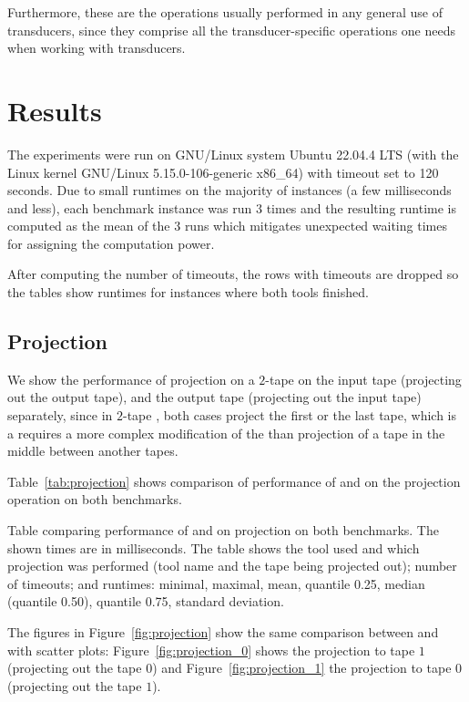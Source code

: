 Furthermore, these are the operations usually performed in any general use of transducers, since they comprise all the transducer-specific operations one needs when working with transducers.

\section{Results}

The experiments were run on GNU/Linux system Ubuntu 22.04.4 LTS (with the Linux kernel GNU/Linux 5.15.0-106-generic x86\_64) with timeout set to 120 seconds. Due to small runtimes on the majority of instances (a few milliseconds and less), each benchmark instance was run $3$ times and the resulting runtime is computed as the mean of the $3$ runs which mitigates unexpected waiting times for assigning the computation power.

After computing the number of timeouts, the rows with timeouts are dropped so the tables show runtimes for instances where both tools finished.

\subsection{Projection}

We show the performance of projection on a $2$-tape \nfts on the input tape (projecting out the output tape), and the output tape (projecting out the input tape) separately, since in $2$-tape \nfts, both cases project the first or the last tape, which is a requires a more complex modification of the \nft than projection of a tape in the middle between another tapes.

Table~\ref{tab:projection} shows comparison of performance of \mata and \mona on the projection operation on both benchmarks.

\begin{table}[ht]
  \centering
  
  \caption{
    Table comparing performance of \mata and \mona on projection on both benchmarks.
    The shown times are in milliseconds.
    The table shows the tool used and which projection was performed (tool name and the tape being projected out); number of timeouts; and runtimes: minimal, maximal, mean, quantile 0.25, median (quantile 0.50), quantile 0.75, standard deviation.
  }
  \label{tab:projection}
\end{table}

The figures in Figure~\ref{fig:projection} show the same comparison between \mata and \mona with scatter plots: Figure~\ref{fig:projection_0} shows the projection to tape $1$ (projecting out the tape $0$) and Figure~\ref{fig:projection_1} the projection to tape $0$ (projecting out the tape $1$).

